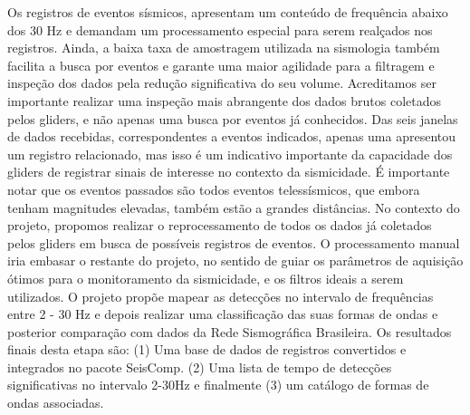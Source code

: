 \documentclass[10pt,a4paper,oneside]{book}
\begin{document}
Os registros de eventos sísmicos, apresentam um conteúdo de frequência abaixo dos 30 Hz e demandam um processamento especial para serem realçados nos registros. Ainda, a baixa taxa de amostragem utilizada na sismologia também facilita a busca por eventos e garante uma maior agilidade para a filtragem e inspeção dos dados pela redução significativa do seu volume. Acreditamos ser importante realizar uma inspeção mais abrangente dos dados brutos coletados pelos gliders, e não apenas uma busca por eventos já conhecidos. Das seis janelas de dados recebidas, correspondentes a eventos indicados, apenas uma apresentou um registro relacionado, mas isso é um indicativo importante da capacidade dos gliders de registrar sinais de interesse no contexto da sismicidade. É importante notar que os eventos passados são todos eventos telessísmicos, que embora tenham magnitudes elevadas, também estão a grandes distâncias. No contexto do projeto, propomos realizar o reprocessamento de todos os dados já coletados pelos gliders em busca de possíveis registros de eventos. O processamento manual iria embasar o restante do projeto, no sentido de guiar os parâmetros de aquisição ótimos para o monitoramento da sismicidade, e os filtros ideais a serem utilizados. O projeto propõe mapear as detecções no intervalo de frequências entre 2 - 30 Hz e depois realizar uma classificação das suas formas de ondas e posterior comparação com dados da Rede Sismográfica Brasileira. Os resultados finais desta etapa são: (1) Uma base de dados de registros convertidos e integrados no pacote SeisComp. (2) Uma lista de tempo de detecções significativas no intervalo 2-30Hz e finalmente (3) um catálogo de formas de ondas associadas. 
\end{document}
